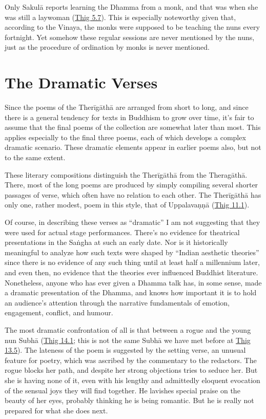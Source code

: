 \documentclass[12pt,openany]{book}%
\begin{document}
Only \textsanskrit{Sakulā} reports learning the Dhamma from a monk, and that was when she was still a laywoman (\href{https://suttacentral.net/thig5.7}{Thig 5.7}). This is especially noteworthy given that, according to the Vinaya, the monks were supposed to be teaching the nuns every fortnight. Yet somehow these regular sessions are never mentioned by the nuns, just as the procedure of ordination by monks is never mentioned.

\section*{The Dramatic Verses}

Since the poems of the \textsanskrit{Therīgāthā} are arranged from short to long, and since there is a general tendency for texts in Buddhism to grow over time, it’s fair to assume that the final poems of the collection are somewhat later than most. This applies especially to the final three poems, each of which develops a complex dramatic scenario. These dramatic elements appear in earlier poems also, but not to the same extent.

These literary compositions distinguish the \textsanskrit{Therīgāthā} from the \textsanskrit{Theragāthā}. There, most of the long poems are produced by simply compiling several shorter passages of verse, which often have no relation to each other. The \textsanskrit{Therīgāthā} has only one, rather modest, poem in this style, that of \textsanskrit{Uppalavaṇṇā} (\href{https://suttacentral.net/thig11.1}{Thig 11.1}).

Of course, in describing these verses as “dramatic” I am not suggesting that they were used for actual stage performances. There’s no evidence for theatrical presentations in the \textsanskrit{Saṅgha} at such an early date. Nor is it historically meaningful to analyze how such texts were shaped by “Indian aesthetic theories” since there is no evidence of any such thing until at least half a millennium later, and even then, no evidence that the theories ever influenced Buddhist literature. Nonetheless, anyone who has ever given a Dhamma talk has, in some sense, made a dramatic presentation of the Dhamma, and knows how important it is to hold an audience’s attention through the narrative fundamentals of emotion, engagement, conflict, and humour.

The most dramatic confrontation of all is that between a rogue and the young nun \textsanskrit{Subhā} (\href{https://suttacentral.net/thig14.1}{Thig 14.1}; this is not the same \textsanskrit{Subhā} we have met before at \href{https://suttacentral.net/thig13.5}{Thig 13.5}). The lateness of the poem is suggested by the setting verse, an unusual feature for poetry, which was ascribed by the commentary to the redactors. The rogue blocks her path, and despite her strong objections tries to seduce her. But she is having none of it, even with his lengthy and admittedly eloquent evocation of the sensual joys they will find together. He lavishes special praise on the beauty of her eyes, probably thinking he is being romantic. But he is really not prepared for what she does next.
\end{document}
